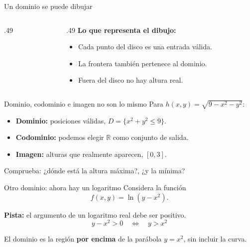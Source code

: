 \documentclass[main.tex]{subfiles}
\begin{document}
\begin{frame}{Un dominio se puede dibujar}
\begin{columns}[c]
\begin{column}{.49\textwidth}
\centering
{}
\end{column}
\begin{column}{.49\textwidth}
\textbf{Lo que representa el dibujo:}
\begin{itemize}
\item Cada punto del disco es una entrada válida.
\item La frontera también pertenece al dominio.
\item Fuera del disco no hay altura real.
\end{itemize}
\end{column}
\end{columns}
\end{frame}

\begin{frame}{Dominio, codominio e imagen no son lo mismo}
Para $h(x,y)=\sqrt{9-x^2-y^2}$:
\begin{itemize}
\item \textbf{Dominio:} posiciones válidas, $D=\{x^2+y^2\leq9\}$.
\medskip
\item \textbf{Codominio:} podemos elegir $\mathbb R$ como conjunto de salida.
\medskip
\item \textbf{Imagen:} alturas que realmente aparecen, $[0,3]$.
\end{itemize}
\medskip

\alert{Comprueba:} ¿dónde está la altura máxima?, ¿y la mínima?
\end{frame}

\begin{frame}{Otro dominio: ahora hay un logaritmo}
Considera la función
\[
f(x,y)=\ln(y-x^2).
\]
\medskip

\textbf{Pista:} el argumento de un logaritmo real debe ser positivo.
\[
y-x^2>0
\quad\Longleftrightarrow\quad
\boxed{y>x^2}
\]
\medskip

El dominio es la región \textbf{por encima} de la parábola $y=x^2$, sin incluir la curva.
\end{frame}
\end{document}
